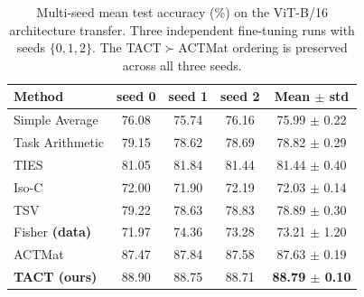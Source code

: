 \begin{table}[h]
\caption{Multi-seed mean test accuracy (\%) on the ViT-B/16 architecture transfer. Three independent fine-tuning runs with seeds $\{0,1,2\}$. The TACT$\succ$ACTMat ordering is preserved across all three seeds.}
\label{tab:b16_seeds}
\centering
\small
\begin{tabular}{lcccc}
\toprule
Method & seed 0 & seed 1 & seed 2 & Mean $\pm$ std \\
\midrule
Simple Average & 76.08 & 75.74 & 76.16 & 75.99 $\pm$ 0.22 \\
Task Arithmetic & 79.15 & 78.62 & 78.69 & 78.82 $\pm$ 0.29 \\
TIES & 81.05 & 81.84 & 81.44 & 81.44 $\pm$ 0.40 \\
Iso-C & 72.00 & 71.90 & 72.19 & 72.03 $\pm$ 0.14 \\
TSV & 79.22 & 78.63 & 78.83 & 78.89 $\pm$ 0.30 \\
Fisher \textbf{(data)} & 71.97 & 74.36 & 73.28 & 73.21 $\pm$ 1.20 \\
ACTMat & 87.47 & 87.84 & 87.58 & 87.63 $\pm$ 0.19 \\
\textbf{TACT (ours)} & 88.90 & 88.75 & 88.71 & \textbf{88.79 $\pm$ 0.10} \\
\bottomrule
\end{tabular}
\end{table}
